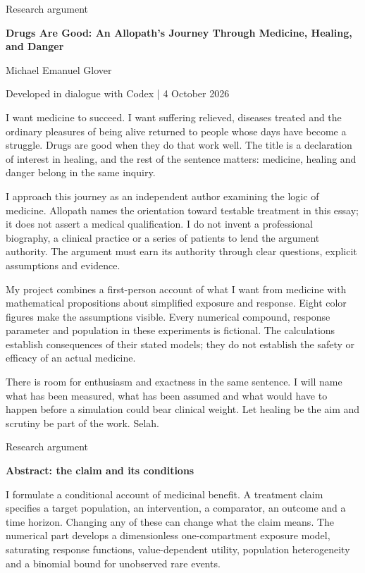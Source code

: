 \documentclass[10pt]{article}
\begin{document}
{\small\color{accent}Research argument}\par
{\LARGE\bfseries\color{ink}Drugs Are Good: An Allopath's Journey Through Medicine, Healing, and Danger}\par\vspace{7pt}
Michael Emanuel Glover\par Developed in dialogue with Codex | 4 October 2026\par\vspace{8pt}
I want medicine to succeed. I want suffering relieved, diseases treated and the ordinary pleasures of being alive returned to people whose days have become a struggle. Drugs are good when they do that work well. The title is a declaration of interest in healing, and the rest of the sentence matters: medicine, healing and danger belong in the same inquiry.\par
I approach this journey as an independent author examining the logic of medicine. Allopath names the orientation toward testable treatment in this essay; it does not assert a medical qualification. I do not invent a professional biography, a clinical practice or a series of patients to lend the argument authority. The argument must earn its authority through clear questions, explicit assumptions and evidence.\par
My project combines a first-person account of what I want from medicine with mathematical propositions about simplified exposure and response. Eight color figures make the assumptions visible. Every numerical compound, response parameter and population in these experiments is fictional. The calculations establish consequences of their stated models; they do not establish the safety or efficacy of an actual medicine.\par
There is room for enthusiasm and exactness in the same sentence. I will name what has been measured, what has been assumed and what would have to happen before a simulation could bear clinical weight. Let healing be the aim and scrutiny be part of the work. Selah.\par
\clearpage
{\small\color{accent}Research argument}\par
{\LARGE\bfseries\color{ink}Abstract: the claim and its conditions}\par\vspace{7pt}
I formulate a conditional account of medicinal benefit. A treatment claim specifies a target population, an intervention, a comparator, an outcome and a time horizon. Changing any of these can change what the claim means. The numerical part develops a dimensionless one-compartment exposure model, saturating response functions, value-dependent utility, population heterogeneity and a binomial bound for unobserved rare events.\par
\end{document}
